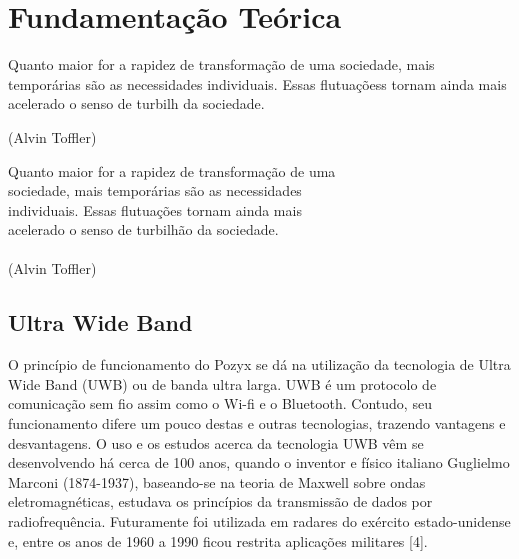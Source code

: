 \chapter{Fundamentação Teórica}
\label{chap:fundteor}

\begin{flushright}

   \begin{list}{}{
      \setlength{\leftmargin}{4.5cm}
      \setlength{\rightmargin}{0cm}
      \setlength{\labelwidth}{0pt}
      \setlength{\labelsep}{\leftmargin}}
      \item Quanto maior for a rapidez de transformação de uma
      sociedade, mais temporárias são as necessidades
      individuais. Essas flutuaçõess tornam ainda mais acelerado
      o senso de turbilh da sociedade.

      \begin{list}{}{
      \setlength{\leftmargin}{0cm}
      \setlength{\rightmargin}{0cm}
      \setlength{\labelwidth}{0pt}
      \setlength{\labelsep}{\leftmargin}}
      \item (Alvin Toffler)
      \end{list}
   \end{list}
\end{flushright}

\begin{flushright}
  Quanto maior for a rapidez de transformação de uma \\
  sociedade, mais temporárias são as necessidades \\
  individuais. Essas flutuações tornam ainda mais \\
  acelerado o senso de turbilhão da sociedade. \\
  \ \\
  (Alvin Toffler)
\end{flushright}

\section{Ultra Wide Band}
\label{sec:sota}
O princípio de funcionamento do Pozyx se dá na utilização da tecnologia 
de Ultra Wide Band (UWB) ou de banda ultra larga. UWB é um protocolo de comunicação sem fio
assim como o Wi-fi e o Bluetooth. Contudo, seu funcionamento difere um pouco destas e outras tecnologias,
trazendo vantagens e desvantagens. O uso e os estudos acerca da tecnologia UWB vêm se desenvolvendo
há cerca de 100 anos, quando o inventor e físico italiano Guglielmo Marconi (1874-1937), baseando-se na teoria 
de Maxwell sobre ondas eletromagnéticas, estudava os princípios da transmissão de dados por radiofrequência. Futuramente 
foi utilizada em radares do exército estado-unidense e, entre os anos de 1960 a 1990 ficou restrita aplicações militares [4].

